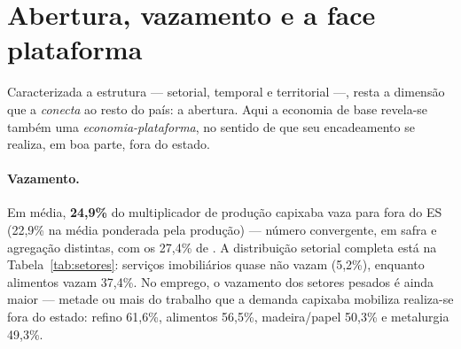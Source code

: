 \documentclass[11pt,a4paper]{article}
\begin{document}
\section{Abertura, vazamento e a face plataforma}
\label{sec:plataforma}
Caracterizada a estrutura --- setorial, temporal e territorial ---, resta a dimensão que a
\emph{conecta} ao resto do país: a abertura. Aqui a economia de base revela-se também uma
\emph{economia-plataforma}, no sentido de que seu encadeamento se realiza, em boa parte, fora
do estado.

\paragraph{Vazamento.} Em média, \textbf{24,9\%} do multiplicador de produção capixaba vaza
para fora do ES (22,9\% na média ponderada pela produção) --- número convergente, em safra e
agregação distintas, com os 27,4\% de \citet{haddad2017iioas}. A distribuição setorial completa
está na Tabela~\ref{tab:setores}: serviços imobiliários quase não vazam (5,2\%), enquanto
alimentos vazam 37,4\%. No emprego, o vazamento dos setores
pesados é ainda maior --- metade ou mais do trabalho que a demanda capixaba mobiliza realiza-se
fora do estado: refino 61,6\%, alimentos 56,5\%, madeira/papel 50,3\% e metalurgia 49,3\%.

\begin{table}[tbp]
\centering\small

\caption{Multiplicador de produção ($O_j$), vazamentos de produção e de emprego e
ligações de Rasmussen-Hirschman dos 26 setores do ES, ordenados pelo vazamento do
multiplicador de produção. Vazamento médio: simples 24,9\%; ponderado pela produção 22,9\%.
Fonte: \texttt{12\_tab\_setores.py} sobre \texttt{outputs/es\_setores\_resultados.csv}.}
\label{tab:setores}
\end{table}
\end{document}
